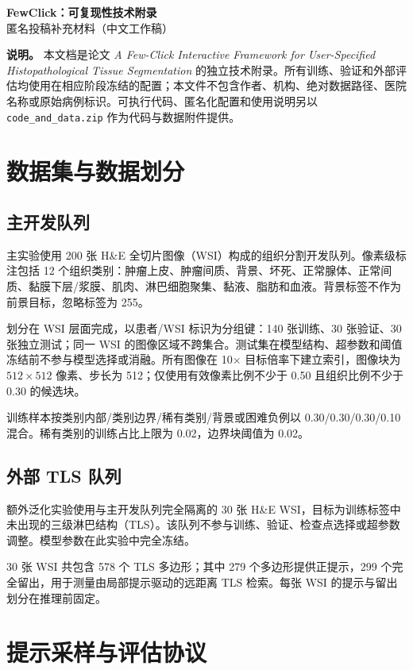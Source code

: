 \documentclass[11pt,letterpaper]{ctexart}
\newcommand{\code}[1]{\texttt{#1}}
\begin{document}
\begin{center}
{\LARGE \textbf{FewClick：可复现性技术附录}}\\[5pt]
{\large 匿名投稿补充材料（中文工作稿）}
\end{center}

\noindent\textbf{说明。} 本文档是论文 \emph{A Few-Click Interactive Framework for User-Specified Histopathological Tissue Segmentation} 的独立技术附录。所有训练、验证和外部评估均使用在相应阶段冻结的配置；本文件不包含作者、机构、绝对数据路径、医院名称或原始病例标识。可执行代码、匿名化配置和使用说明另以 \code{code\_and\_data.zip} 作为代码与数据附件提供。

\section{数据集与数据划分}
\subsection{主开发队列}
主实验使用 200 张 H\&E 全切片图像（WSI）构成的组织分割开发队列。像素级标注包括 12 个组织类别：肿瘤上皮、肿瘤间质、背景、坏死、正常腺体、正常间质、黏膜下层/浆膜、肌肉、淋巴细胞聚集、黏液、脂肪和血液。背景标签不作为前景目标，忽略标签为 255。

划分在 WSI 层面完成，以患者/WSI 标识为分组键：140 张训练、30 张验证、30 张独立测试；同一 WSI 的图像区域不跨集合。测试集在模型结构、超参数和阈值冻结前不参与模型选择或消融。所有图像在 10$\times$ 目标倍率下建立索引，图像块为 $512\times512$ 像素、步长为 512；仅使用有效像素比例不少于 0.50 且组织比例不少于 0.30 的候选块。

训练样本按类别内部/类别边界/稀有类别/背景或困难负例以 0.30/0.30/0.30/0.10 混合。稀有类别的训练占比上限为 0.02，边界块阈值为 0.02。

\subsection{外部 TLS 队列}
额外泛化实验使用与主开发队列完全隔离的 30 张 H\&E WSI，目标为训练标签中未出现的三级淋巴结构（TLS）。该队列不参与训练、验证、检查点选择或超参数调整。模型参数在此实验中完全冻结。

30 张 WSI 共包含 578 个 TLS 多边形；其中 279 个多边形提供正提示，299 个完全留出，用于测量由局部提示驱动的远距离 TLS 检索。每张 WSI 的提示与留出划分在推理前固定。

\section{提示采样与评估协议}
\end{document}
